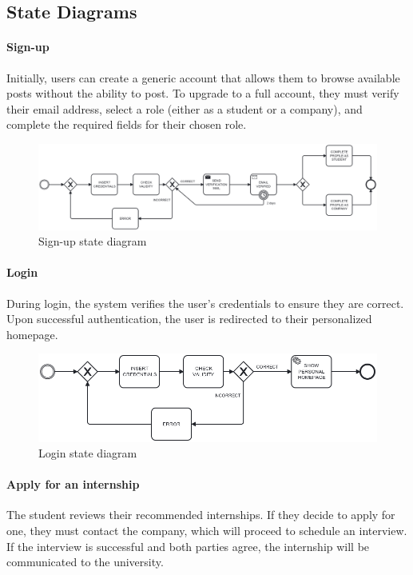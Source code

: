\subsection{State Diagrams}
\label{subsec:class_diagrams}%

\paragraph{Sign-up} Initially, users can create a generic account that allows them to browse available posts without the ability to post. To upgrade to a full account, they must verify their email address, select a role (either as a student or a company), and complete the required fields for their chosen role.

\begin{figure}[H]
    \centering
    \includegraphics[width=1\linewidth]{Images//state diagrams/SIGNUP.png}
    \caption{Sign-up state diagram}
    \label{fig:enter-label}
\end{figure}

\paragraph{Login} During login, the system verifies the user's credentials to ensure they are correct. Upon successful authentication, the user is redirected to their personalized homepage.

\begin{figure}[H]
    \centering
    \includegraphics[width=1\linewidth]{Images//state diagrams/LOGIN.png}
    \caption{Login state diagram}
    \label{fig:enter-label}
\end{figure}

\paragraph{Apply for an internship} The student reviews their recommended internships. If they decide to apply for one, they must contact the company, which will proceed to schedule an interview. If the interview is successful and both parties agree, the internship will be communicated to the university.

